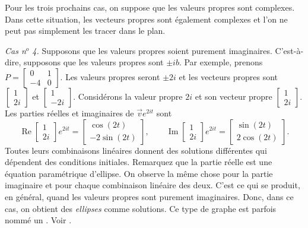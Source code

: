 \medskip

\pagebreak[0]
Pour les trois prochains cas, on suppose que les valeurs propres sont complexes. Dans cette situation, les vecteurs propres sont également complexes et l'on ne peut pas simplement les tracer dans le plan.

\medskip

\pagebreak[0]
\emph{Cas n$^o$ 4.} Supposons que les valeurs propres soient purement imaginaires. C’est-à-dire, supposons que les valeurs propres sont $\pm ib$. Par exemple, prenons $P = 
\left[ \begin{smallmatrix} 0 & 1 \\ -4 & 0 \end{smallmatrix} \right]$.
Les valeurs propres seront $\pm 2i$ et les vecteurs propres sont
$\left[ \begin{smallmatrix} 1 \\ 2i \end{smallmatrix} \right]$ et
$\left[ \begin{smallmatrix} 1 \\ -2i \end{smallmatrix} \right]$.  Considérons la valeur propre $2i$ et son vecteur propre
$\left[ \begin{smallmatrix} 1 \\ 2i \end{smallmatrix} \right]$.
Les parties réelles et imaginaires de $\vec{v} e^{2it}$ sont
\begin{equation*}
\operatorname{Re}
\begin{bmatrix} 1 \\ 2i \end{bmatrix} e^{2it} =
\begin{bmatrix} \cos (2t) \\ -2 \sin (2t)  \end{bmatrix} ,
\qquad
\operatorname{Im}
\begin{bmatrix} 1 \\ 2i \end{bmatrix} e^{2it} =
\begin{bmatrix} \sin (2t) \\ 2 \cos (2t) \end{bmatrix} .
\end{equation*}
Toutes leurs combinaisons linéaires donnent des solutions différentes qui dépendent des conditions initiales. Remarquez que la partie réelle est une équation paramétrique d’ellipse. On observe la même chose pour la partie imaginaire et pour chaque combinaison linéaire des deux. C’est ce qui se produit, en général, quand les valeurs propres sont purement imaginaires. Donc, dans ce cas, on obtient des \emph{ellipses} comme solutions. Ce type de graphe est parfois nommé un \emph{}. Voir .

